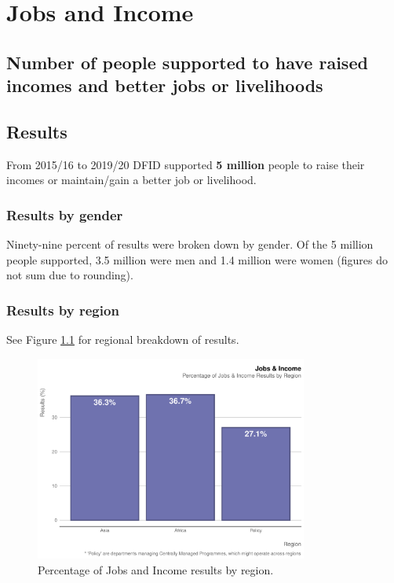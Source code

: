 \chapter{Jobs and Income}

\section*{Number of people supported to have raised incomes and better jobs  or livelihoods}

\thispagestyle{empty}




\section{Results}
From 2015/16 to 2019/20 DFID supported \textbf{
5 million
} people to raise their incomes or maintain/gain a better job or livelihood. %

\subsection{Results by gender}
Ninety-nine percent of results were broken down by gender. %
Of the
5
million people supported,
3.5
million were men and
1.4
million were women (figures do not sum due to rounding).

\subsection{Results by region}
See Figure \ref{fig:jobs_region_plot} for regional breakdown of results.  %


\begin{figure}[htbp]
	\centering
\begin{knitrout}
\color{fgcolor}
\includegraphics[width=0.8\textwidth]{figs/jobs_region_plot-1} 

\end{knitrout}
	\caption{Percentage of Jobs and Income results by region.}
	\label{fig:jobs_region_plot}
\end{figure}



